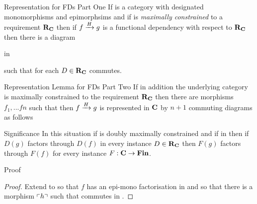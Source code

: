 \begin{frame}{Representation for FDs Part One}{\slidecontext}
If \catcw is a category with designated monomorphisms and epimorphsims  and if \catcw is
\textit{maximally constrained} to a requirement $\reqtc$ then
if $\fundep{H}{f}{g}$  is a functional dependency with respect to $\reqtc$
then there is a diagram\\
\medskip
\begin{minipage}[t][.45cm][t]{5.5cm} %
\scalebox{0.9}{\representationdiagram} 
\hspace*{\fill} in \catc
\end{minipage} 
\pause \begin{minipage}[t]{4.5cm}
such that for each $D \in \reqtc$
\scalebox{0.85}{\mappedrepresentationdiagram}
\hspace*{\fill} commutes.
\end{minipage}
\end{frame}

\begin{frame}{Representation Lemma for FDs Part Two}{\slidecontext}
If in addition the underlying category \catcw is maximally constrained  
 to the requirement $\reqtc$ then
there are morphisms $f_1,...fn$ such that
then $\fundep{H}{f}{g}$ is represented in $\catc$ by  $n+1$ commuting diagrams
as follows
\begin{center}
\scalebox{0.9}{\fullrepresentationdiagram}
\end{center} 
\end{frame}

\begin{frame}{Significance}
In this situation if \catcw is doubly maximally constrained 
and if \scalebox{0.9}{\fgsourcediagram} in \catcw
then if $D(g)$ factors through
$D(f)$ in every instance $D \in \reqtc$  then   
$F(g)$ factors through
$F(f)$ for every instance $F: \catc \morph \Fin$. 
\end{frame}

\iffalse
\begin{frame} {Proof}
\begin{proof} Extend \catcw to \catcpw so that $f$ has an epi-mono factorisation in \catcpw
and so that there  is a morphism $\qq{h}$ such that
commutes in \catcp.  
\end{proof}
\end{frame}

